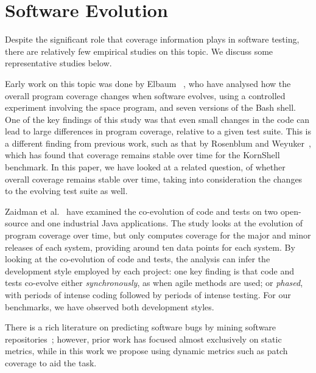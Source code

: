 \section{Software Evolution}
\label{related:evolution}

Despite the significant role that coverage information plays in
software testing, there are relatively few empirical studies on this
topic.  We discuss some representative studies below.

Early work on this topic was done by Elbaum \etal~\cite{cov-evol:icsm01}, who
have analysed how the overall program coverage changes when software evolves,
using a controlled experiment involving the \textsf{space} program, and seven
versions of the Bash shell.  One of the key findings of this study was that
even small changes in the code can lead to large differences in program
coverage, relative to a given test suite.  This is a different finding from
previous work, such as that by Rosenblum and Weyuker~\cite{cov_regr97}, which
has found that coverage remains stable over time for the KornShell benchmark.
In this paper, we have looked at a related question, of whether overall
coverage remains stable over time, taking into consideration the changes to the
evolving test suite as well.

Zaidman et al.~\cite{coevol:emse11} have examined the co-evolution of
code and tests on two open-source and one industrial Java
applications.  The study looks at the evolution of program coverage
over time, but only computes coverage for the major and minor releases
of each system, providing around ten data points for each system.  By
looking at the co-evolution of code and tests, the analysis can infer
the development style employed by each project: one key finding is
that code and tests co-evolve either \textit{synchronously}, as when
agile methods are used; or \textit{phased}, with periods of intense
coding followed by periods of intense testing.  For our
benchmarks, we have observed both development styles.

There is a rich literature on predicting software bugs by mining
software repositories~\cite{bug-feature:icse13,genealogies:issre13};
however, prior work has focused almost exclusively on static metrics,
while in this work we propose using dynamic metrics such as patch
coverage to aid the task.


